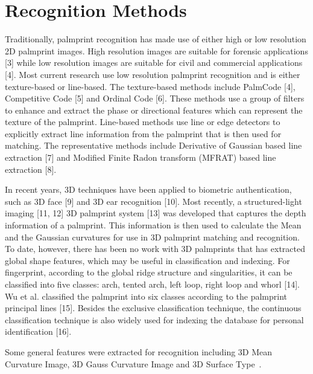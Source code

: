 \section{Recognition Methods}
\label{sec:pastwork:recogmethods}

Traditionally, palmprint recognition has made use of either high or low resolution 2D palmprint images. High resolution images are suitable for forensic applications [3] while low resolution images are suitable for civil and commercial applications [4]. Most current research use low resolution palmprint recognition and is either texture-based or line-based. The texture-based methods include PalmCode [4], Competitive Code [5] and Ordinal Code [6]. These methods use a group of filters to enhance and extract the phase or directional features which can represent the texture of the palmprint. Line-based methods use line or edge detectors to explicitly extract line information from the palmprint that is then used for matching. The representative methods include Derivative of Gaussian based line extraction [7] and Modified Finite Radon transform (MFRAT) based line extraction [8].

In recent years, 3D techniques have been applied to biometric authentication, such as 3D face [9] and 3D ear recognition [10]. Most recently, a structured-light imaging [11, 12] 3D palmprint system [13] was developed that captures the depth information of a palmprint. This information is then used to calculate the Mean and the Gaussian curvatures for use in 3D palmprint matching and recognition. To date, however, there has been no work with 3D palmprints that has extracted global shape features, which may be useful in classification and indexing. For fingerprint, according to the global ridge structure and singularities, it can be classified into five classes: arch, tented arch, left loop, right loop and whorl [14]. Wu et al. classified the palmprint into six classes according to the palmprint principal lines [15]. Besides the exclusive classification technique, the continuous classification technique is also widely used for indexing the database for personal identification [16].

Some general features were extracted for recognition including 3D Mean Curvature Image, 3D Gauss Curvature Image and 3D Surface Type~\cite{Zhang:2008kc,Li:2009eq}.

